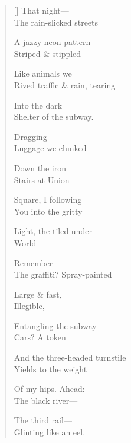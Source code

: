 \label{ch:leaving_new_york}
\settowidth{\versewidth}{                                        Dragging}
\begin{verse}[\versewidth]
That night---\\
The rain-slicked streets

A jazzy neon pattern---\\
Striped \& stippled

Like animals we\\
Rived traffic \& rain, tearing

Into the dark\\
Shelter of the subway.

                                        Dragging\\
Luggage we clunked

Down the iron\\
Stairs at Union

Square, I following\\
You into the gritty

Light, the tiled under\\
World---

Remember\\
The graffiti?     Spray-painted

Large \& fast,\\
Illegible,

Entangling the subway\\
Cars?   A token

And the three-headed turnstile\\
Yields to the weight

Of my hips. Ahead:\\
The black river---

The third rail---\\
Glinting like an eel.
\end{verse}
